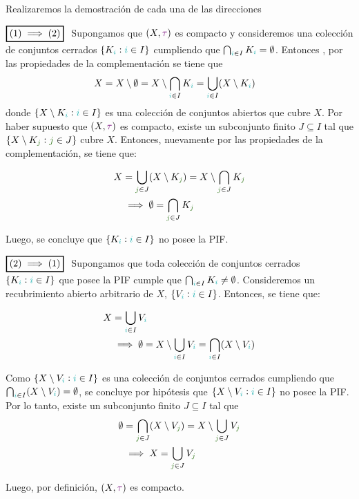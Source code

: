 \documentclass[titlepage,11pt,a4paper]{book}
\newcommand{\ii}{\ensuremath{\textcolor{TealBlue}{i}}}
\newcommand{\jj}{\ensuremath{\textcolor{OliveGreen}{j}}}
\newcommand{\taut}{\textcolor{Fuchsia}{\tau}}
\newcommand{\borde}[1]{%
  \begingroup
  \setlength{\fboxsep}{2.5pt}%
  \setlength{\fboxrule}{1pt}%
  \textcolor{black}{\fbox{\normalcolor\ensuremath{#1}}}%
  \hspace{4pt}%
  \vspace{0.5 pt}
  \endgroup
}
\begin{document}
\begin{dem}
    Realizaremos la demostración de cada una de las direcciones

    \medskip
    $\borde{(1) \implies (2)}$ Supongamos que $(X, \taut)$ es compacto y consideremos una colección de conjuntos cerrados $\{K_{\ii} : \ii \in I\}$ cumpliendo que $\bigcap_{\ii \in I} K_{\ii} = \emptyset$. Entonces , por las propiedades de la complementación se tiene que
    \[
    \begin{aligned}
        X = X \setminus \emptyset &= X \setminus \bigcap_{\ii \in I} K_{\ii} = \bigcup_{\ii \in I} (X \setminus K_{\ii})
    \end{aligned}
    \]
    donde $\{X \setminus K_{\ii} : \ii \in I\}$ es una colección de conjuntos abiertos que cubre $X$. Por haber supuesto que $(X, \taut)$ es compacto, existe un subconjunto finito $J \subseteq I$ tal que $\{X \setminus K_{\jj} : \jj \in J\}$ cubre $X$.
    Entonces, nuevamente por las propiedades de la complementación, se tiene que:

    \[
    \begin{aligned}
        X &= \bigcup_{\jj \in J} (X \setminus K_{\jj}) = X \setminus \bigcap_{\jj \in J} K_{\jj}\\
         &\implies \emptyset= \bigcap_{\jj \in J} K_{\jj}
    \end{aligned}
    \]

    Luego, se concluye que $\{K_{\ii} : \ii \in I\}$ no posee la PIF.

    \medskip
    $\borde{(2) \implies (1)}$ Supongamos que toda colección de conjuntos cerrados $\{K_{\ii} : \ii \in I\}$ que posee la PIF cumple que $\bigcap_{\ii \in I} K_{\ii} \neq \emptyset$. Consideremos un recubrimiento abierto arbitrario de $X$,  $\{V_{\ii} : \ii \in I\}$. Entonces, se tiene que:

    \[
    \begin{aligned}
        X &= \bigcup_{\ii \in I} V_{\ii} \\
        &\implies \emptyset = X \setminus \bigcup_{\ii \in I} V_{\ii} = \bigcap_{\ii \in I} (X \setminus V_{\ii}) 
    \end{aligned}
    \]
    \medskip

    Como $\{X \setminus V_{\ii} : \ii \in I\}$ es una colección de conjuntos cerrados cumpliendo que $\bigcap_{\ii \in I} (X \setminus V_{\ii}) = \emptyset$, se concluye por hipótesis  que $\{X \setminus V_{\ii} : \ii \in I\}$ no posee la PIF. Por lo tanto, existe un subconjunto finito $J \subseteq I$ tal que
    \[
    \begin{aligned}
     \emptyset &= \bigcap_{\jj \in J} (X \setminus V_{\jj}) = X \setminus \bigcup_{\jj \in J} V_{\jj}\\
     & \implies X = \bigcup_{\jj \in J} V_{\jj}
    \end{aligned}
    \]

    Luego, por definición, $(X, \taut)$ es compacto.

\end{dem}
\end{document}
